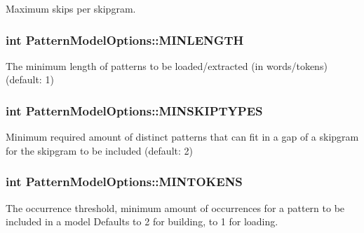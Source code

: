 Maximum skips per skipgram. 

\hypertarget{classPatternModelOptions_a4dada20f1bba3cc5e08a49e4a9bfb545}{}
\subsubsection[{M\+I\+N\+L\+E\+N\+G\+T\+H}]{\setlength{\rightskip}{0pt plus 5cm}int Pattern\+Model\+Options\+::\+M\+I\+N\+L\+E\+N\+G\+T\+H}\label{classPatternModelOptions_a4dada20f1bba3cc5e08a49e4a9bfb545}


The minimum length of patterns to be loaded/extracted (in words/tokens) (default\+: 1) 

\hypertarget{classPatternModelOptions_ad5b2686b6f641463c54441a595259046}{}
\subsubsection[{M\+I\+N\+S\+K\+I\+P\+T\+Y\+P\+E\+S}]{\setlength{\rightskip}{0pt plus 5cm}int Pattern\+Model\+Options\+::\+M\+I\+N\+S\+K\+I\+P\+T\+Y\+P\+E\+S}\label{classPatternModelOptions_ad5b2686b6f641463c54441a595259046}


Minimum required amount of distinct patterns that can fit in a gap of a skipgram for the skipgram to be included (default\+: 2) 

\hypertarget{classPatternModelOptions_a4572cfbca28c3130d98f886a4c1857e0}{}
\subsubsection[{M\+I\+N\+T\+O\+K\+E\+N\+S}]{\setlength{\rightskip}{0pt plus 5cm}int Pattern\+Model\+Options\+::\+M\+I\+N\+T\+O\+K\+E\+N\+S}\label{classPatternModelOptions_a4572cfbca28c3130d98f886a4c1857e0}
The occurrence threshold, minimum amount of occurrences for a pattern to be included in a model Defaults to 2 for building, to 1 for loading. \hypertarget{classPatternModelOptions_a130b2214a2a9eaaa4862f8019fdfe2bc}{}
